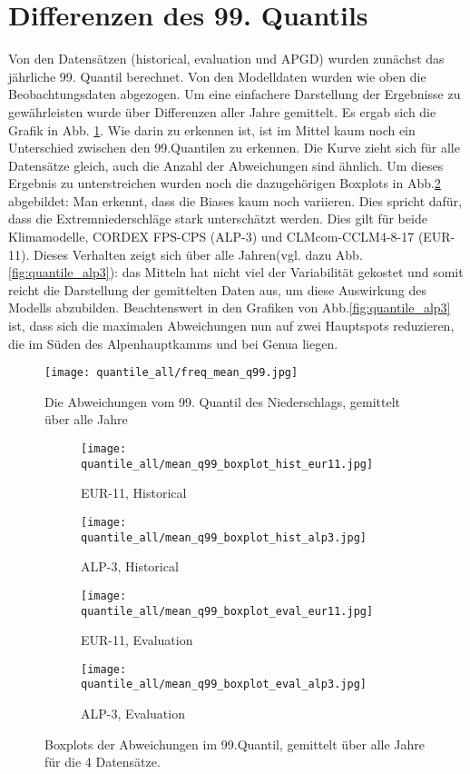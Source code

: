 \section{Differenzen des 99. Quantils}
Von den Datensätzen (historical, evaluation und APGD) wurden zunächst das jährliche 99. Quantil berechnet. Von den Modelldaten wurden wie oben die Beobachtungsdaten abgezogen. Um eine einfachere Darstellung der Ergebnisse zu gewährleisten wurde über Differenzen aller Jahre gemittelt. Es ergab sich die Grafik in Abb. \ref{fig:quantile_all}. Wie darin zu erkennen ist, ist im Mittel kaum noch ein Unterschied zwischen den 99.Quantilen zu erkennen. Die Kurve zieht sich für alle Datensätze  gleich, auch die Anzahl der Abweichungen sind ähnlich. Um dieses Ergebnis zu unterstreichen wurden noch die dazugehörigen Boxplots in Abb.\ref{fig:quantile_all_boxplots} abgebildet: Man erkennt, dass die Biases kaum noch variieren. Dies spricht dafür, dass die Extremniederschläge stark unterschätzt werden. Dies gilt für beide Klimamodelle, CORDEX FPS-CPS (ALP-3) und CLMcom-CCLM4-8-17 (EUR-11). Dieses Verhalten zeigt sich über alle Jahren(vgl. dazu Abb. \ref{fig:quantile_alp3}): das Mitteln hat nicht viel der Variabilität gekostet und somit reicht die Darstellung der gemittelten Daten aus, um diese Auswirkung des Modells abzubilden. Beachtenswert in den Grafiken von Abb.\ref{fig:quantile_alp3} ist, dass sich die maximalen Abweichungen nun auf zwei Hauptspots reduzieren, die im Süden des Alpenhauptkamms und bei Genua liegen. 
\begin{figure}
	\texttt{[image: quantile\_all/freq\_mean\_q99.jpg]}
	\caption{Die Abweichungen vom 99. Quantil des Niederschlags, gemittelt über alle Jahre}
	\label{fig:quantile_all}
\end{figure}
\begin{figure}
	\begin{subfigure}{0.49\textwidth}
		\texttt{[image: quantile\_all/mean\_q99\_boxplot\_hist\_eur11.jpg]}
		\caption{EUR-11, Historical}
	\end{subfigure}
	\begin{subfigure}{0.49\textwidth}
		\texttt{[image: quantile\_all/mean\_q99\_boxplot\_hist\_alp3.jpg]}
		\caption{ALP-3, Historical}
	\end{subfigure}
	\begin{subfigure}{0.49\textwidth}
		\texttt{[image: quantile\_all/mean\_q99\_boxplot\_eval\_eur11.jpg]}
		\caption{EUR-11, Evaluation}
	\end{subfigure}
	\begin{subfigure}{0.49\textwidth}
		\texttt{[image: quantile\_all/mean\_q99\_boxplot\_eval\_alp3.jpg]}
		\caption{ALP-3, Evaluation}
	\end{subfigure}
	\caption{Boxplots der Abweichungen im 99.Quantil, gemittelt über alle Jahre für die 4 Datensätze.}
	\label{fig:quantile_all_boxplots}
\end{figure}
